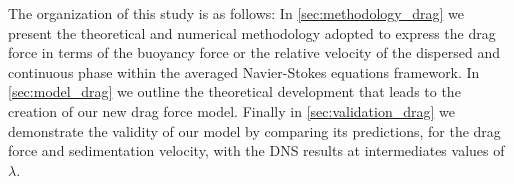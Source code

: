 The organization of this study is as follows:
In \ref{sec:methodology_drag} we present the theoretical and numerical methodology adopted to express the drag force in terms of the buoyancy force or the relative velocity of the dispersed and continuous phase within the averaged Navier-Stokes equations framework.
In \ref{sec:model_drag} we outline the theoretical development that leads to the creation of our new drag force model. 
Finally in \ref{sec:validation_drag} we demonstrate the validity of our model by comparing its predictions, for the drag force and sedimentation velocity, with the DNS results at intermediates values of $\lambda$.